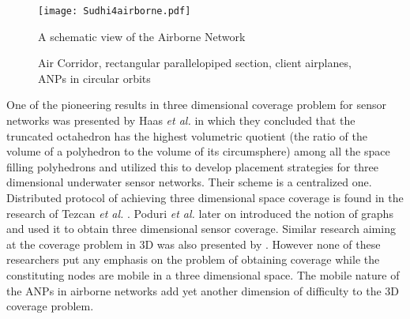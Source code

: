 \documentclass[10pt]{IEEEtran}
\begin{document}
\begin{center}
\begin{figure*}[tbh]
    \begin{minipage}[tbh]{0.6\linewidth}
        \centering
       	\texttt{[image: Sudhi4airborne.pdf]}
	\caption{A schematic view of the Airborne Network }
	\label{fig:airborne}
    \end{minipage}
    \hfill
    \begin{minipage}[tbh]{0.35\linewidth}
        \centering
	\hfill
	\hfill
	\caption{Air Corridor, rectangular parallelopiped section, client airplanes, ANPs in circular orbits}
	\label{fig:airCorridor}
    \end{minipage}
\end{figure*}
\end{center}

One of the pioneering results in three dimensional coverage problem for sensor networks was presented by Haas {\em et al.} \cite{HAAS08,HAAS06} in which they concluded that the truncated octahedron has the highest volumetric quotient (the ratio of the volume of a polyhedron to the volume of its circumsphere) among all the space filling polyhedrons and utilized this to develop placement strategies for three dimensional underwater sensor networks. Their scheme is a centralized one. Distributed protocol of achieving three dimensional space coverage is found in the research of Tezcan {\em et al.} \cite{TEZ04}. Poduri {\em et al.} \cite{POD06} later on introduced the notion of  graphs and used it to obtain three dimensional sensor coverage. Similar research aiming at the coverage problem in 3D was also presented by \cite{CHEN08, LEI07, HUANG04}. However none of these researchers put any emphasis on the problem of obtaining coverage while the constituting nodes are mobile in a three dimensional space. The mobile nature of the ANPs in airborne networks add yet another dimension of difficulty to the 3D coverage problem.
\end{document}
